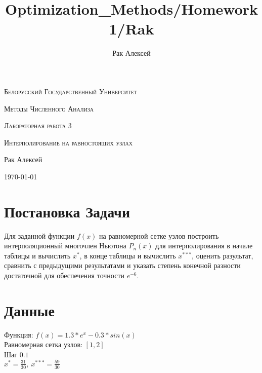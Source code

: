 \documentclass[10pt]{scrartcl}
\begin{document}
\author{Рак Алексей}
\title{Optimization_Methods/Homework1/Rak}
\begin{titlepage}
		\centering
		{\scshape\LARGE Белорусский Государственный Университет \par}
        \vfill
        {\scshape\LARGE Методы Численного Анализа\par}
        \vspace{1cm}
        {\scshape\LARGE Лабораторная работа 3\par}
        \vspace{1cm}
        {\scshape\LARGE Интерполирование на равностоящих узлах\par}
        \vspace{2cm}
        {\LARGE Рак Алексей\par}
        \vfill
        {\large \today}
\end{titlepage}
\section*{Постановка Задачи}\noindent
Для заданной функции $f(x)$ на равномерной сетке узлов построить интерполяционный многочлен Ньютона $P_n(x)$ для интерполирования в начале таблицы и вычислить $x^*$, в
конце таблицы и вычислить $x^{***}$, оценить разультат, сравнить с предыдущими 
результатами и указать степень конечной разности достаточной для обеспечения точности $e^{-6}$.
\section*{Данные}\noindent
Функция: $f(x) = 1.3 * e^x - 0.3 * sin(x)$\\
Равномерная сетка узлов: $[1, 2]$\\
Шаг $0.1$\\
$x^{*} = \frac{31}{30}, \ x^{***} = \frac{59}{30}$
\end{document}

